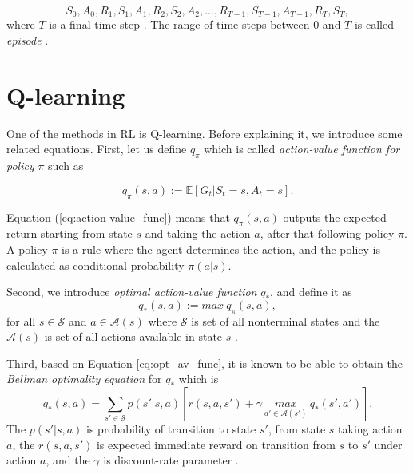 \begin{equation}
  \label{eq:trajectory}
  S_{0}, A_{0}, R_{1}, S_{1}, A_{1}, R_{2}, S_{2}, A_{2}, ..., R_{T-1}, S_{T-1}, A_{T-1}, R_{T}, S_{T},
\end{equation}
where $T$ is a final time step \cite{sutton2018rl}. The range of time steps between $0$ and $T$ is called {\it episode} \cite{sutton2018rl}.


\section{Q-learning}
One of the methods in RL is Q-learning. Before explaining it, we introduce some related equations. First, let us define $q_{\pi}$ which is called {\it action-value function for policy} $\pi$ \cite{sutton2018rl} such as

\begin{equation}
  \label{eq:action-value_func}
  q_{\pi}(s,a) := \mathbb{E}[G_{t} | S_{t}=s, A_{t}=s].
\end{equation}

Equation (\ref{eq:action-value_func}) means that $q_{\pi}(s,a)$ outputs the expected return starting from state $s$ and taking the action $a$, after that following policy $\pi$. A policy $\pi$ is a rule where the agent determines the action, and the policy is calculated as conditional probability $\pi(a|s)$.

Second, we introduce {\it optimal action-value function} $q_{*}$, and define it as
\begin{equation}
  \label{eq:opt_av_func}
  q_{*}(s,a) := max \ q_{\pi}(s,a),
\end{equation}
for all $s \in \mathcal{S} $ and $a \in \mathcal{A}(s) $ where $\mathcal{S}$ is set of all nonterminal states and the $\mathcal{A}(s)$ is set of all actions available in state $s$ \cite{sutton2018rl}.

Third, based on Equation \ref{eq:opt_av_func}, it is known to be able to obtain the {\it Bellman optimality equation} for $q_{*}$ \cite{korekara} which is 
\begin{equation}
  \label{eq:Bellman_opt_eq}
  q_{*}(s,a) = \displaystyle \sum_{s'\in \mathcal{S}} p(s'|s,a)[r(s,a,s')+\gamma \ \underset{a' \in \mathcal{A}(s')}{max} \ q_{*}(s',a')].
\end{equation}
The $p(s'|s,a)$ is probability of transition to state $s'$, from state $s$ taking action $a$, the $r(s,a,s')$ is expected immediate reward on transition from $s$ to $s'$ under action $a$, and the $\gamma$ is discount-rate parameter \cite{sutton2018rl}.

